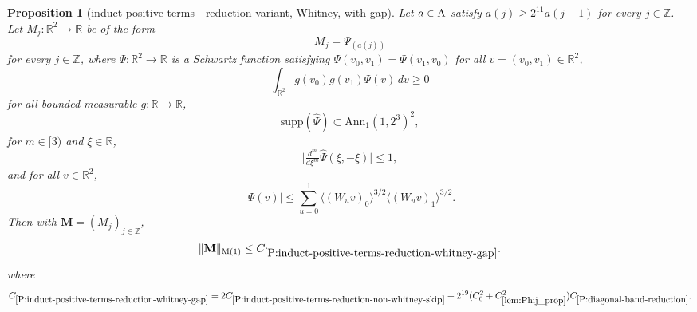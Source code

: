 \documentclass[12pt,reqno]{amsart}
\theoremstyle{plain}
\newtheorem{proposition}[theorem]{Proposition}
\numberwithin{equation}{section}
\theoremstyle{remark}
\newcommand{\using}[1]{}
\newcommand{\Z}{{\mathbb Z}}
\newcommand{\R}{{\mathbb R}}
\newcommand{\M}{\mathbf{M}}
\begin{document}
\begin{proposition}[induct positive terms - reduction variant, Whitney, with gap]
\label{P:induct-positive-terms-reduction-whitney-gap}\using{lem:Phij_prop}\using{lem:form_pos}\using{P:induct-positive-terms-reduction-non-whitney-skip}\using{P:vanishing-diagonal-reduction}\using{lem:smoothdecay2}\using{lem:scaleest}\using{P:diagonal-band-reduction}
Let $a\in {\rm A}$ satisfy $a(j)\geq 2^{11}a(j-1)$ for every $j\in\mathbb Z$. Let $M_j:\mathbb{R}^2\to \mathbb{R}$ be of the form
\begin{equation}\label{auto:Whitney-gap-kernel}
M_j=\Psi_{(a(j))}
\end{equation}
for every $j\in\Z$, where $\Psi:\mathbb{R}^2\to \mathbb{R}$ is a Schwartz function satisfying $\Psi(v_0,v_1)=\Psi(v_1,v_0)$ for all $v=(v_0,v_1)\in\mathbb{R}^2$,
\begin{equation}\label{p1-on-W_pos}
\int_{\mathbb{R}^2} g(v_0){g(v_1)}\Psi(v)\,dv\ge 0
\end{equation}
for all bounded measurable $g:\mathbb{R}\to\mathbb{R}$,
\begin{equation}\label{p1-on-W_supp}
\mathrm{supp}(\widehat{\Psi}) \subset \mathrm{Ann}_1(1, 2^3)^2,
\end{equation}
for $m\in [3)$ and $\xi \in \R$,
\begin{equation}\label{p1-on-W_der}
\Big|\tfrac{d^m}{d\xi^{m}} \widehat{\Psi}(\xi,-\xi)\Big| \leq 1,
\end{equation}
and for all $v\in\mathbb{R}^2$,
\begin{equation}\label{p1-on-W_decay}
|\Psi(v)| \le \sum_{u=0}^1 \langle(W_u v)_0\rangle^{3/2} \langle (W_u v)_1\rangle^{3/2}.
\end{equation}
Then with $\M=(M_j)_{j\in\Z}$,
\begin{equation}\label{auto:Whitney-gap-reduction-bound}
\|\M\|_{\rm M(1)} \le C_{\ref{P:induct-positive-terms-reduction-whitney-gap}}.
\end{equation}
where
\begin{equation}\label{auto:Whitney-gap-constant-definition}
C_{\ref{P:induct-positive-terms-reduction-whitney-gap}}
=2C_{\ref{P:induct-positive-terms-reduction-non-whitney-skip}}
+2^{19}(C_0^2+C_{\ref{lem:Phij_prop}}^2)C_{\ref{P:diagonal-band-reduction}}.
\end{equation}
\end{proposition}
\end{document}
